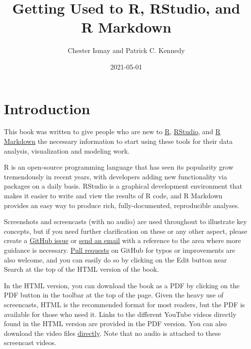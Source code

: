 \documentclass[]{tufte-book}
\title{Getting Used to R, RStudio, and R Markdown}
\author{Chester Ismay and Patrick C. Kennedy}
\date{2021-05-01}
\begin{document}
\maketitle



{
\setcounter{tocdepth}{1}
\tableofcontents
}

\hypertarget{intro}{%
\chapter{Introduction}\label{intro}}

This book was written to give people who are new to \href{https://www.r-project.org}{R}, \href{https://www.rstudio.com}{RStudio}, and \href{http://rmarkdown.rstudio.com}{R Markdown}
the necessary information to start using these tools for their data analysis,
visualization and modeling work.

R is an open-source programming language that has seen its popularity grow tremendously in recent years, with developers adding new functionality via packages on a daily basis. RStudio is a graphical development environment that makes it easier to write and view the results of R code, and R Markdown provides an easy way to produce rich, fully-documented, reproducible analyses.

Screenshots and screencasts (with no audio) are used throughout to illustrate key concepts, but if you need further clarification on these or any other aspect, please create a \href{https://github.com/emielvanloon/rbasics-book/issues}{GitHub issue} or \href{mailto:e.e.vanloon@uva.nl}{send an email} with a reference to the area where more guidance is necessary. \href{https://code.tutsplus.com/courses/git-basics-github-pull-requests}{Pull requests} on GitHub for typos or improvements are also welcome, and you can easily do so by clicking on the Edit button near Search at the top of the HTML version of the book.

In the HTML version, you can download the book as a PDF by clicking on the PDF button in the toolbar at the top of the page. Given the heavy use of screencasts, HTML is the recommended format for most readers, but the PDF is available for those who need it. Links to the different YouTube videos directly found in the HTML version are provided in the PDF version. You can also download the video files \href{https://github.com/emielvanloon/rbasics-book/tree/master/mp4}{directly}. Note that no audio is attached to these screencast videos.
\end{document}
